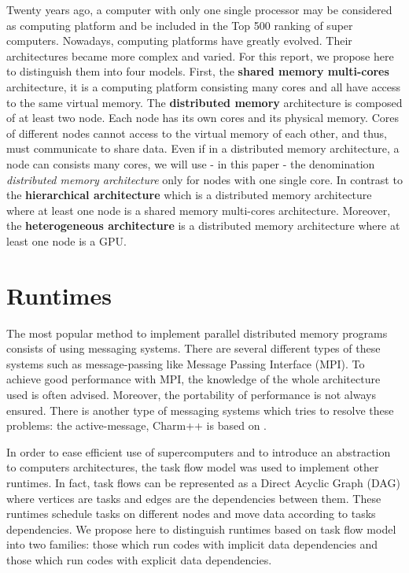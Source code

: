 Twenty years ago, a computer with only one single processor may be considered as computing platform and be included in the Top 500 ranking of super computers. Nowadays, computing platforms have greatly evolved. Their architectures became more complex and varied. For this report, we propose here to distinguish them into four models. First, the \textbf{shared memory multi-cores} architecture, it is a computing platform consisting many cores and all have access to the same virtual memory. The \textbf{distributed memory} architecture is composed of at least two node. Each node has its own cores and its physical memory. Cores of different nodes cannot access to the virtual memory of each other, and thus, must communicate to share data. Even if in a distributed memory architecture, a node can consists many cores,  we will use - in this paper - the denomination \textit{distributed memory architecture} only for nodes with one single core. In contrast to the \textbf{hierarchical architecture} which is a distributed memory architecture where at least one node is a shared memory multi-cores architecture. Moreover, the \textbf{heterogeneous architecture} is a distributed memory architecture where at least one node is a GPU.

\section{Runtimes}
The most popular method to implement parallel distributed memory programs consists of using messaging systems. There are several different types of these systems such as message-passing like Message Passing Interface (MPI)\cite{Message94}. To achieve good performance with MPI, the knowledge of the whole architecture used is often advised. Moreover, the portability of performance is not always ensured. There is another type of messaging systems which tries to resolve these problems: the active-message, Charm++ is based on \cite{KaleLVandK1993b}.

In order to ease efficient use of supercomputers and to introduce an abstraction to computers architectures, the task flow model was used to implement other runtimes. In fact, task flows can be represented as a Direct Acyclic Graph (DAG) where vertices are tasks and edges are the dependencies between them. These runtimes schedule tasks on different nodes and move data according to tasks dependencies.
We propose here to distinguish runtimes based on task flow model into two families: those which run codes with implicit data dependencies and those which run codes with explicit data dependencies.

